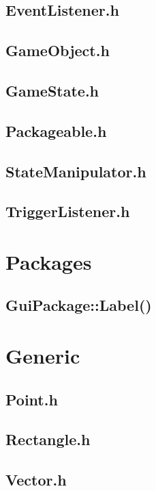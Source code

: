 \documentclass[12pt]{article}
\begin{document}
\subsection{EventListener.h}
\subsection{GameObject.h}
\subsection{GameState.h}
\subsection{Packageable.h}
\subsection{StateManipulator.h}
\subsection{TriggerListener.h}
\section{Packages}
\subsection{GuiPackage::Label()}
\section{Generic}
\subsection{Point.h}
\subsection{Rectangle.h}
\subsection{Vector.h}
\end{document}
